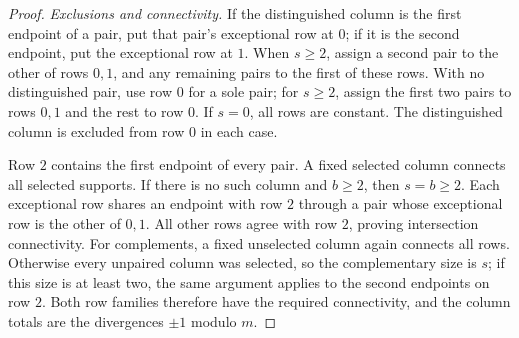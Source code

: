 \documentclass[10pt,a4paper]{amsart}
\begin{document}
\begin{proof}
\emph{Exclusions and connectivity.}
If the distinguished column is the first endpoint of a pair, put that
pair's exceptional row at $0$; if it is the second endpoint, put the
exceptional row at $1$. When $s\ge2$, assign a second pair to the other of
rows $0,1$, and any remaining pairs to the first of these rows. With no
distinguished pair, use row $0$ for a sole pair; for $s\ge2$, assign the
first two pairs to rows $0,1$ and the rest to row $0$. If $s=0$, all rows
are constant. The distinguished column is excluded from row $0$ in each case.

Row $2$ contains the first endpoint of every pair. A fixed selected column
connects all selected supports. If there is no such column and $b\ge2$,
then $s=b\ge2$. Each exceptional row shares an endpoint with row $2$
through a pair whose exceptional row is the other of $0,1$. All other rows
agree with row $2$, proving intersection connectivity.
For complements, a fixed unselected column again connects all rows.
Otherwise every unpaired column was selected, so the complementary size
is $s$; if this size is at least two, the same argument applies to the
second endpoints on row $2$. Both row families therefore have the required
connectivity, and the column totals are the divergences $\pm1$ modulo $m$.
\end{proof}
\end{document}
